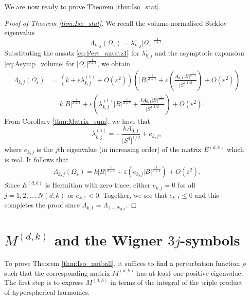 \documentclass[11pt]{amsart}
\theoremstyle{definition}
\theoremstyle{plain}
\theoremstyle{remark}
\newcommand{\vareps}{\varepsilon}
\newcommand{\abs}[1]{\lvert{#1}\rvert}
\begin{document}
We are now ready to prove Theorem \ref{thm:Iso_stat}. 

\begin{proof}[Proof of Theorem \ref{thm:Iso_stat}]  
We recall the volume-normalised Steklov eigenvalue 
\begin{equation} 
\Lambda_{k, j}(\Omega_\vareps)= \lambda_{k, j}^{\vareps}\abs{\Omega_\vareps}^{\frac{1}{d + 1}}. 
\end{equation} 
Substituting the ansatz \eqref{eq:Pert_ansatz1} for $\lambda_{k, j}^\vareps$ and the asymptotic expansion \eqref{eq:Asymp_volume} for $\abs{\Omega_\vareps}^{\frac{1}{d + 1}}$, we obtain 
\begin{align*} 
\Lambda_{k, j}(\Omega_\vareps) & = \left(k + \vareps\lambda_{k, j}^{(1)} + O(\vareps^2)\right)\left(\abs{B}^{\frac{1}{d + 1}} + \vareps\left(\frac{A_{0, 1}\abs{B}^{\frac{1}{d + 1}}}{\abs{S^d}^{1/2}}\right) + O(\vareps^2)\right) \\ 
& = k\abs{B}^{\frac{1}{d + 1}} + \vareps\left(\lambda_{k, j}^{(1)}\abs{B}^{\frac{1}{d + 1}} + \frac{kA_{0, 1}\abs{B}^{\frac{1}{d + 1}}}{\abs{S^d}^{1/2}}\right) + O(\vareps^2). 
\end{align*} 
From Corollary \ref{thm:Matrix_sum}, we have that 
\begin{equation*} 
\lambda_{k, j}^{(1)} = -\frac{kA_{0, 1}}{\abs{S^d}^{1/2}} + e_{k, j}, 
\end{equation*} 
where $e_{k, j}$ is the $j$th eigenvalue (in increasing order) of the matrix $E^{(d, k)}$ which is real. It follows that 
\begin{align*} 
\Lambda_{k, j}(\Omega_\vareps) = k\abs{B}^{\frac{1}{d + 1}} + \vareps\left(e_{k, j}\abs{B}^{\frac{1}{d + 1}}\right) + O(\vareps^2). 
\end{align*} 
Since $E^{(d, k)}$ is Hermitian with zero trace, either $e_{k, j} = 0$ for all $j = 1, 2, \dots, N(d, k)$ or $e_{k, 1} < 0$. Together, we see that $e_{k, 1}\le 0$ and this completes the proof since $\Lambda_{k, 1} = \Lambda_{1 + N_{d, k}}$. 
\end{proof} 





\section{$M^{(d, k)}$ and the Wigner $3j$-symbols} \label{sec:Wigner} 
To prove Theorem \ref{thm:Iso_notball}, it suffices to find a perturbation function $\rho$ such that the corresponding matrix $M^{(d, k)}$ has at least one positive eigenvalue. The first step is to express $M^{(d, k)}$ in terms of the integral of the triple product of hyperspherical harmonics. 
\end{document}
